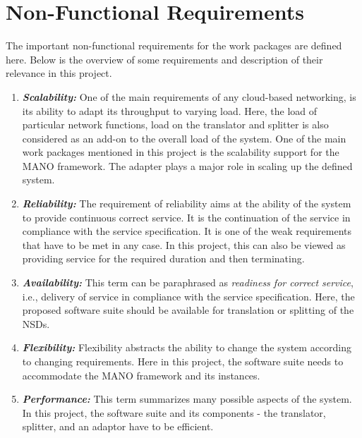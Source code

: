 \chapter{Non-Functional Requirements}
\label{ch:Non-Functional Requirements}

The important non-functional requirements for the work packages are defined here. Below is the overview of some requirements and description of their relevance in this project.


\begin{enumerate}
	\item \textit {\textbf{Scalability:}} One of the main requirements of any cloud-based networking, is its ability to adapt its throughput to varying load. Here, the load of particular network functions, load on the translator and splitter is also considered as an add-on to the overall load of the system. One of the main work packages mentioned in this project is the scalability support for the MANO framework. The adapter plays a major role in scaling up the defined system.
	
	\item \textit {\textbf{Reliability:}} The requirement of reliability aims at the ability of the system to provide continuous correct service. It is the continuation of the service in compliance with the service specification. It is one of the weak requirements that have to be met in any case. In this project, this can also be viewed as providing service for the required duration and then terminating.
	
	\item \textit {\textbf{Availability:}} This term can be paraphrased as \textit {readiness for correct service}, i.e., delivery of service in compliance with the service specification. Here, the proposed software suite should be available for translation or splitting of the NSDs.
	
	\item \textit{\textbf{Flexibility:}} Flexibility abstracts the ability to change the system according to changing requirements. Here in this project, the software suite needs to accommodate the MANO framework and its instances. 
	
	\item \textit{\textbf{Performance:}} This term summarizes many possible aspects of the system. In this project, the software suite and its components - the translator, splitter, and an adaptor have to be efficient.
\end{enumerate}

